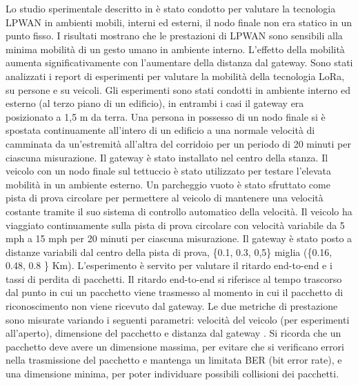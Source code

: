 \documentclass[a4paper]{report} %
\begin{document}
Lo studio sperimentale descritto in \cite{art:rif.47} è stato condotto per valutare la tecnologia LPWAN in ambienti mobili, interni ed esterni, il nodo finale non era statico in un punto fisso. I risultati mostrano che le prestazioni di LPWAN sono sensibili alla minima mobilità di un gesto umano in ambiente interno. L'effetto della mobilità aumenta significativamente con l'aumentare della distanza dal gateway. %
Sono stati analizzati i report di esperimenti per valutare la mobilità della tecnologia LoRa, su persone e su veicoli. Gli esperimenti sono stati condotti in ambiente interno ed esterno (al terzo piano di un edificio), in entrambi i casi il gateway era posizionato a 1,5 m da terra. Una persona in possesso di un nodo finale si è spostata continuamente all'intero di un edificio a una normale velocità di camminata da un'estremità all'altra del corridoio per un periodo di 20 minuti per ciascuna misurazione. Il gateway è stato installato nel centro della stanza. Il veicolo con un nodo finale sul tettuccio è stato utilizzato per testare l'elevata mobilità in un ambiente esterno. Un parcheggio vuoto è stato sfruttato come pista di prova circolare per permettere al veicolo di mantenere una velocità costante tramite il suo sistema di controllo automatico della velocità. Il veicolo ha viaggiato continuamente sulla pista di prova circolare con velocità variabile da 5 mph a 15 mph per 20 minuti per ciascuna misurazione. Il gateway è stato posto a distanze variabili dal centro della pista di prova, \{0.1, 0.3, 0,5\} miglia (\{0.16, 0.48, 0.8 \} Km). 
L'esperimento è servito per valutare il ritardo end-to-end e i tassi di perdita di pacchetti. Il ritardo end-to-end si riferisce al tempo trascorso dal punto in cui un pacchetto viene trasmesso al momento in cui il pacchetto di riconoscimento non viene ricevuto dal gateway. Le due metriche di prestazione sono misurate variando i seguenti parametri: velocità del veicolo (per esperimenti all'aperto), dimensione del pacchetto e distanza dal gateway \cite{art:rif.47}. 
Si ricorda che un pacchetto deve avere un dimensione massima, per evitare che si verificano errori nella trasmissione del pacchetto e mantenga un limitata BER (bit error rate), e una dimensione minima, per poter individuare possibili collisioni dei pacchetti.
\end{document}
